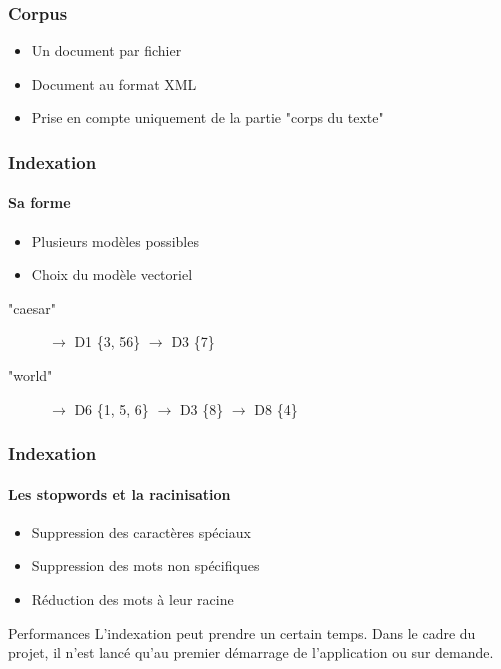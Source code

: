 \documentclass{beamer}
\begin{document}
\begin{frame}

\frametitle{Corpus}

\begin{itemize}
 \item Un document par fichier
 \item Document au format XML
 \item Prise en compte uniquement de la partie "corps du texte"
\end{itemize}

 
\end{frame}

\begin{frame}

\frametitle{Indexation}
\framesubtitle{Sa forme}

\begin{itemize}
 \item Plusieurs mod\`eles possibles
 \item Choix du mod\`ele vectoriel
\end{itemize}


\begin{description}
 \item["caesar"] $\rightarrow$ D1 \{3, 56\} $\rightarrow$ D3 \{7\}
 \item["world"] $\rightarrow$ D6 \{1, 5, 6\} $\rightarrow$ D3 \{8\} $\rightarrow$ D8 \{4\}
\end{description}
 
\end{frame}

\begin{frame}

\frametitle{Indexation}
\framesubtitle{Les stopwords et la racinisation}

\begin{itemize}
 \item Suppression des caract\`eres sp\'eciaux
 \item Suppression des mots non sp\'ecifiques
 \item R\'eduction des mots \`a leur racine
\end{itemize}

\begin{block}{Performances}
 L'indexation peut prendre un certain temps. Dans le cadre du projet, il n'est lanc\'e qu'au premier d\'emarrage de l'application ou sur demande.
\end{block}

 
\end{frame}
\end{document}

